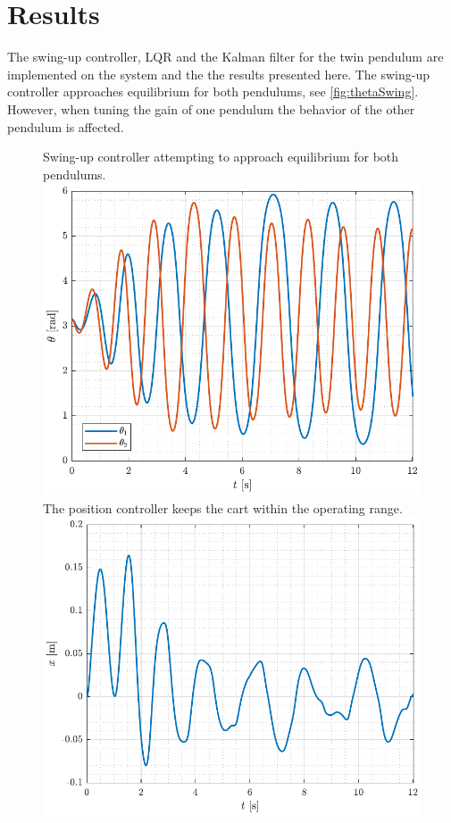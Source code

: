 %
\chapter{Results}\label{chap:results}
The swing-up controller, LQR and the Kalman filter for the twin pendulum are implemented on the system and the the results presented here.
%
%
The swing-up controller approaches equilibrium for both pendulums, see \autoref{fig:thetaSwing}. However, when tuning the gain of one pendulum the behavior of the other pendulum is affected.
%
\begin{figure}[H]
  \hspace{-10pt}
  \captionbox
  {
    Swing-up controller attempting to approach equilibrium for both pendulums.
    \label{fig:thetaSwing}
  }
  {
    \hspace{-1cm}
    \includegraphics[width=.478\textwidth]{figures/thetaSwing}
  }
  \hspace{20pt}
  \captionbox 
  {
    The position controller keeps the cart within the operating range.
    \label{fig:xSwing}
  }
  {
    \hspace{-1cm}
    \includegraphics[width=.5\textwidth]{figures/xSwing}
  }  
\end{figure}
%
%
